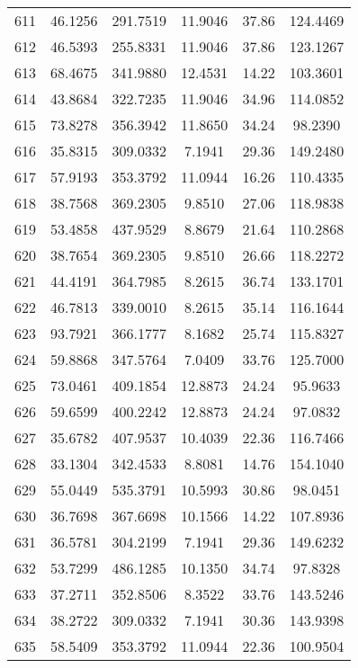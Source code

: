 \begin{center}
\begin{footnotesize}
\begin{tabular}{|c|ccccc|}
611 & 46.1256 & 291.7519 & 11.9046 & 37.86 & 124.4469 \\
612 & 46.5393 & 255.8331 & 11.9046 & 37.86 & 123.1267 \\
613 & 68.4675 & 341.9880 & 12.4531 & 14.22 & 103.3601 \\
614 & 43.8684 & 322.7235 & 11.9046 & 34.96 & 114.0852 \\
615 & 73.8278 & 356.3942 & 11.8650 & 34.24 & 98.2390 \\
616 & 35.8315 & 309.0332 & 7.1941 & 29.36 & 149.2480 \\
617 & 57.9193 & 353.3792 & 11.0944 & 16.26 & 110.4335 \\
618 & 38.7568 & 369.2305 & 9.8510 & 27.06 & 118.9838 \\
619 & 53.4858 & 437.9529 & 8.8679 & 21.64 & 110.2868 \\
620 & 38.7654 & 369.2305 & 9.8510 & 26.66 & 118.2272 \\
621 & 44.4191 & 364.7985 & 8.2615 & 36.74 & 133.1701 \\
622 & 46.7813 & 339.0010 & 8.2615 & 35.14 & 116.1644 \\
623 & 93.7921 & 366.1777 & 8.1682 & 25.74 & 115.8327 \\
624 & 59.8868 & 347.5764 & 7.0409 & 33.76 & 125.7000 \\
625 & 73.0461 & 409.1854 & 12.8873 & 24.24 & 95.9633 \\
626 & 59.6599 & 400.2242 & 12.8873 & 24.24 & 97.0832 \\
627 & 35.6782 & 407.9537 & 10.4039 & 22.36 & 116.7466 \\
628 & 33.1304 & 342.4533 & 8.8081 & 14.76 & 154.1040 \\
629 & 55.0449 & 535.3791 & 10.5993 & 30.86 & 98.0451 \\
630 & 36.7698 & 367.6698 & 10.1566 & 14.22 & 107.8936 \\
631 & 36.5781 & 304.2199 & 7.1941 & 29.36 & 149.6232 \\
632 & 53.7299 & 486.1285 & 10.1350 & 34.74 & 97.8328 \\
633 & 37.2711 & 352.8506 & 8.3522 & 33.76 & 143.5246 \\
634 & 38.2722 & 309.0332 & 7.1941 & 30.36 & 143.9398 \\
635 & 58.5409 & 353.3792 & 11.0944 & 22.36 & 100.9504 \\
\hline
\end{tabular}
\end{footnotesize}
\end{center}

